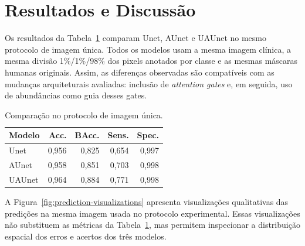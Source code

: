 \documentclass[conference]{IEEEtran}
\begin{document}
\section{Resultados e Discussão}

Os resultados da Tabela~\ref{tab:single-image-results} comparam Unet,
AUnet e UAUnet no mesmo protocolo de imagem única. Todos os modelos usam a
mesma imagem clínica, a mesma divisão 1\%/1\%/98\% dos pixels
anotados por classe e as mesmas máscaras humanas originais. Assim, as diferenças
observadas são compatíveis com as mudanças arquiteturais avaliadas: inclusão de
\textit{attention gates} e, em seguida, uso de abundâncias como guia desses
gates.

\begin{table}[ht]
\centering
\caption{Comparação no protocolo de imagem única.}
\label{tab:single-image-results}
\begin{tabular}{lrrrr}
\hline
Modelo & Acc. & BAcc. & Sens. & Spec. \\
\hline
Unet & 0,956 & 0,825 & 0,654 & 0,997 \\
AUnet & 0,958 & 0,851 & 0,703 & 0,998 \\
UAUnet & 0,964 & 0,884 & 0,771 & 0,998 \\
\hline
\end{tabular}
\end{table}

A Figura~\ref{fig:prediction-visualizations} apresenta visualizações
qualitativas das predições na mesma imagem usada no protocolo experimental.
Essas visualizações não substituem as métricas da Tabela~\ref{tab:single-image-results},
mas permitem inspecionar a distribuição espacial dos erros e acertos dos três
modelos.
\end{document}
